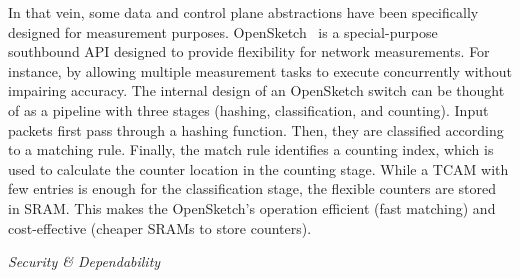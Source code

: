 In that vein, some data and control plane abstractions have been specifically designed for measurement purposes.
OpenSketch~\cite{yu2013-1} is a special-purpose southbound API 
designed to provide flexibility for network measurements.
For instance, by allowing multiple measurement tasks to execute concurrently without impairing accuracy.
The internal design of an OpenSketch switch can be thought of as a pipeline with three stages (hashing, classification, and counting). 
Input packets first pass through a hashing function. 
Then, they are classified according to a matching rule.
Finally, the match rule identifies a counting index, which is used to calculate the counter location in the counting stage. While a TCAM with few 
entries is enough for the classification stage, the flexible counters are stored in SRAM.
This makes the OpenSketch's operation efficient (fast matching) and cost-effective (cheaper SRAMs to store counters).


\vspace{2mm}
\noindent \textit{Security \& Dependability}

